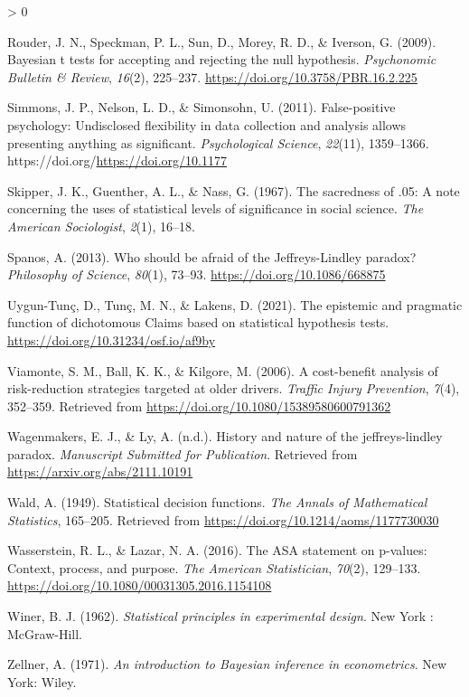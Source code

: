 \documentclass[
  english,
  ,man, a4paper,floatsintext]{apa6}
\newlength{\cslhangindent}
\newenvironment{CSLReferences}[2] %
 {%
  \setlength{\parindent}{0pt}
  \ifodd #1 \everypar{\setlength{\hangindent}{\cslhangindent}}\ignorespaces\fi
  \ifnum #2 > 0
  \setlength{\parskip}{#2\baselineskip}
  \fi
 }%
 {}
\begin{document}
\begin{CSLReferences}{1}{0}
\leavevmode\hypertarget{ref-rouder_bayesian_2009}{}%
Rouder, J. N., Speckman, P. L., Sun, D., Morey, R. D., \& Iverson, G. (2009). Bayesian t tests for accepting and rejecting the null hypothesis. \emph{Psychonomic Bulletin \& Review}, \emph{16}(2), 225--237. \url{https://doi.org/10.3758/PBR.16.2.225}

\leavevmode\hypertarget{ref-simmons2011false}{}%
Simmons, J. P., Nelson, L. D., \& Simonsohn, U. (2011). False-positive psychology: Undisclosed flexibility in data collection and analysis allows presenting anything as significant. \emph{Psychological Science}, \emph{22}(11), 1359--1366. https://doi.org/\url{https://doi.org/10.1177}

\leavevmode\hypertarget{ref-skipper_sacredness_1967}{}%
Skipper, J. K., Guenther, A. L., \& Nass, G. (1967). The sacredness of .05: A note concerning the uses of statistical levels of significance in social science. \emph{The American Sociologist}, \emph{2}(1), 16--18.

\leavevmode\hypertarget{ref-spanos_2013}{}%
Spanos, A. (2013). Who should be afraid of the {Jeffreys}-{Lindley} paradox? \emph{Philosophy of Science}, \emph{80}(1), 73--93. \url{https://doi.org/10.1086/668875}

\leavevmode\hypertarget{ref-tunc_epistemic_2021}{}%
Uygun-Tunç, D., Tunç, M. N., \& Lakens, D. (2021). The epistemic and pragmatic function of dichotomous {Claims} based on statistical hypothesis tests. \url{https://doi.org/10.31234/osf.io/af9by}

\leavevmode\hypertarget{ref-viamonte2006cost}{}%
Viamonte, S. M., Ball, K. K., \& Kilgore, M. (2006). A cost-benefit analysis of risk-reduction strategies targeted at older drivers. \emph{Traffic Injury Prevention}, \emph{7}(4), 352--359. Retrieved from \url{https://doi.org/10.1080/15389580600791362}

\leavevmode\hypertarget{ref-WagenmakersJeffreys}{}%
Wagenmakers, E. J., \& Ly, A. (n.d.). History and nature of the jeffreys-lindley paradox. \emph{Manuscript Submitted for Publication}. Retrieved from \url{https://arxiv.org/abs/2111.10191}

\leavevmode\hypertarget{ref-wald1949statistical}{}%
Wald, A. (1949). Statistical decision functions. \emph{The Annals of Mathematical Statistics}, 165--205. Retrieved from \url{https://doi.org/10.1214/aoms/1177730030}

\leavevmode\hypertarget{ref-wasserstein2016asa}{}%
Wasserstein, R. L., \& Lazar, N. A. (2016). The ASA statement on p-values: Context, process, and purpose. \emph{The American Statistician}, \emph{70}(2), 129--133. \url{https://doi.org/10.1080/00031305.2016.1154108}

\leavevmode\hypertarget{ref-winer_statistical_1962}{}%
Winer, B. J. (1962). \emph{Statistical principles in experimental design}. {New York : McGraw-Hill}.

\leavevmode\hypertarget{ref-zellner_introduction_1971}{}%
Zellner, A. (1971). \emph{An introduction to {Bayesian} inference in econometrics}. {New York}: {Wiley}.

\end{CSLReferences}

\endgroup
\end{document}
